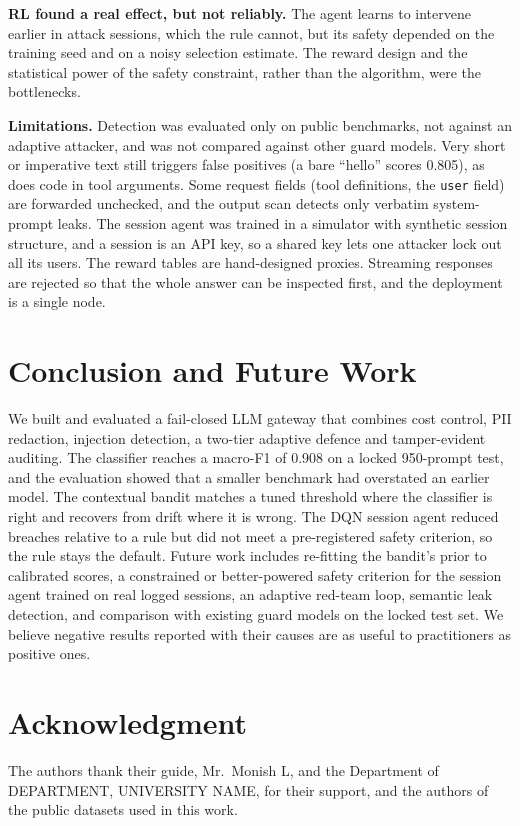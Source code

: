 \documentclass[conference]{IEEEtran}
\begin{document}
\textbf{RL found a real effect, but not reliably.} The agent learns to
intervene earlier in attack sessions, which the rule cannot, but its safety
depended on the training seed and on a noisy selection estimate. The reward
design and the statistical power of the safety constraint, rather than the
algorithm, were the bottlenecks.

\textbf{Limitations.} Detection was evaluated only on public benchmarks,
not against an adaptive attacker, and was not compared against other guard
models. Very short or imperative text still triggers false positives (a
bare ``hello'' scores 0.805), as does code in tool arguments. Some request
fields (tool definitions, the \texttt{user} field) are forwarded unchecked,
and the output scan detects only verbatim system-prompt leaks. The session
agent was trained in a simulator with synthetic session structure, and a
session is an API key, so a shared key lets one attacker lock out all its
users. The reward tables are hand-designed proxies. Streaming responses are
rejected so that the whole answer can be inspected first, and the
deployment is a single node.

\section{Conclusion and Future Work}

We built and evaluated a fail-closed LLM gateway that combines cost
control, PII redaction, injection detection, a two-tier adaptive defence
and tamper-evident auditing. The classifier reaches a macro-F1 of 0.908 on
a locked 950-prompt test, and the evaluation showed that a smaller
benchmark had overstated an earlier model. The contextual bandit matches a
tuned threshold where the classifier is right and recovers from drift where
it is wrong. The DQN session agent reduced breaches relative to a rule
but did not meet a pre-registered safety criterion, so the rule stays the
default. Future work includes re-fitting the bandit's prior to calibrated
scores, a constrained or better-powered safety criterion for the session
agent trained on real logged sessions, an adaptive red-team loop, semantic
leak detection, and comparison with existing guard models on the locked
test set. We believe negative results reported with their causes are as
useful to practitioners as positive ones.

\section*{Acknowledgment}
The authors thank their guide, Mr.\ Monish L, and the Department of
DEPARTMENT, UNIVERSITY NAME, for their support, and the authors of the
public datasets used in this work.
\end{document}
